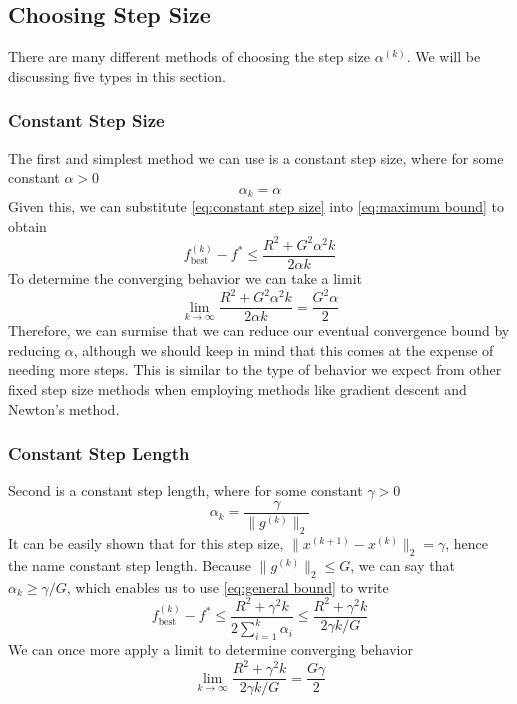 \documentclass[journal,onecolumn]{IEEEtran}
\DeclareMathOperator{\best}{best}
\begin{document}
\subsection{Choosing Step Size}\label{sec:choosing step size}
There are many different methods of choosing the step size \(\alpha^{(k)}\). We will be discussing five types in this section.

\subsubsection{Constant Step Size}\label{sec:constant step size}
The first and simplest method we can use is a constant step size, where for some constant \(\alpha > 0\)
\begin{equation}\label{eq:constant step size}
\alpha_{k} = \alpha
\end{equation}
Given this, we can substitute \eqref{eq:constant step size} into \eqref{eq:maximum bound} to obtain
\begin{equation}\label{eq:constant step size bound}
f^{(k)}_{\best}-f^* \leq \frac{R^2  + G^2 \alpha^2 k}{2\alpha k}
\end{equation}
To determine the converging behavior we can take a limit
\begin{equation}\label{eq:constant step size convergence}
\lim_{k \rightarrow \infty} \frac{R^2  + G^2 \alpha^2 k}{2\alpha k} = \frac{G^2 \alpha}{2}
\end{equation}
Therefore, we can surmise that we can reduce our eventual convergence bound by reducing \(\alpha\), although we should keep in mind that this comes at the expense of needing more steps. This is similar to the type of behavior we expect from other fixed step size methods when employing methods like gradient descent and Newton's method.

\subsubsection{Constant Step Length}\label{sec:constant step length}
Second is a constant step length, where for some constant \(\gamma > 0\)
\begin{equation}\label{eq:constant step length}
\alpha_k = \frac{\gamma}{\|g^{(k)}\|_2}
\end{equation}
It can be easily shown that for this step size, \(\|x^{(k+1)}-x^{(k)}\|_2 = \gamma\), hence the name constant step length. Because \(\|g^{(k)}\|_2 \leq G\), we can say that \(\alpha_k \geq \gamma/G\), which enables us to use \eqref{eq:general bound} to write
\begin{equation}\label{eq:constant step length bound}
f^{(k)}_{\best}-f^* \leq \frac{R^2  + \gamma^2 k}{2\sum^k_{i=1}\alpha_i} \leq \frac{R^2  + \gamma^2 k}{2\gamma k / G}
\end{equation}
We can once more apply a limit to determine converging behavior
\begin{equation}\label{eq:constant step length convergence}
\lim_{k \rightarrow \infty} \frac{R^2  + \gamma^2 k}{2\gamma k / G} = \frac{G \gamma}{2}
\end{equation}
\end{document}
